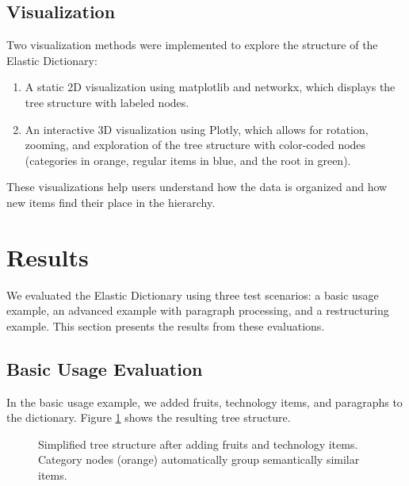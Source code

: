 \documentclass[conference]{IEEEtran}
\begin{document}
\subsection{Visualization}

Two visualization methods were implemented to explore the structure of the Elastic Dictionary:

\begin{enumerate}
    \item A static 2D visualization using matplotlib and networkx, which displays the tree structure with labeled nodes.
    \item An interactive 3D visualization using Plotly, which allows for rotation, zooming, and exploration of the tree structure with color-coded nodes (categories in orange, regular items in blue, and the root in green).
\end{enumerate}

These visualizations help users understand how the data is organized and how new items find their place in the hierarchy.

\section{Results}

We evaluated the Elastic Dictionary using three test scenarios: a basic usage example, an advanced example with paragraph processing, and a restructuring example. This section presents the results from these evaluations.

\subsection{Basic Usage Evaluation}

In the basic usage example, we added fruits, technology items, and paragraphs to the dictionary. Figure \ref{fig:basic_results} shows the resulting tree structure.

\begin{figure}[ht]
\centering
{}
\caption{Simplified tree structure after adding fruits and technology items. Category nodes (orange) automatically group semantically similar items.}
\label{fig:basic_results}
\end{figure}
\end{document}

